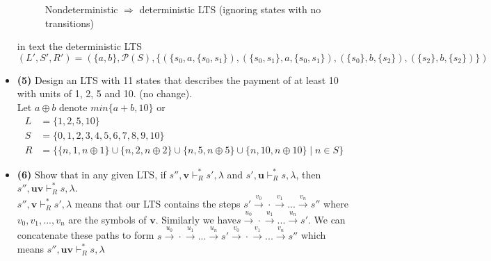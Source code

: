 \documentclass[defaultpackages]{simplereport}
\newcommand{\powerset}[1]{\mathcal{P}(#1)}
\begin{document}
\begin{itemize}[label=]
\begin{figure}[H]
\caption*{Nondeterministic $\Rightarrow$ deterministic LTS (ignoring states with
  no transitions)}
\end{figure}
in text the deterministic LTS $$(L', S', R') = (\{a, b\}, \powerset{S}, \{(\{s_0,
a, \{s_0, s_1\}), (\{s_0, s_1\}, a, \{s_0, s_1\}), (\{s_0\}, b, \{s_2\}),
(\{s_2\}, b, \{s_2\})\})$$

\item \textbf{(5)} Design an LTS with 11 states that describes the payment of at
  least 10 with units of 1, 2, 5 and 10. (no change).
  \\
  Let $a \oplus b \text{ denote } min\{a+b, 10\}$ or 
  \begin{equation*}
    \begin{split}
      L & = \{1, 2, 5, 10\}\\
      S & = \{0, 1, 2, 3, 4, 5, 6, 7, 8, 9, 10\}\\
      R & = \{\{n, 1, n \oplus 1\} \cup\{n, 2, n \oplus 2\} \cup \{n, 5, n \oplus 5\} \cup \{n, 10, n \oplus 10\} \mid n \in S\}
    \end{split}
  \end{equation*}

  \item \textbf{(6)} Show that in any given LTS, if $s'',\bm{v} \vdash^*_R s',
    \lambda$ and $s', \bm{u} \vdash^*_R s, \lambda$, then $s'', \bm{uv}
    \vdash^*_R s, \lambda$.
    \\
 $s'',\bm{v} \vdash^*_R s',\lambda$ means that our LTS contains the steps $s'
 \xrightarrow{v_0} \cdot \xrightarrow{v_1}...\xrightarrow{v_n}s''$ where $v_0,
 v_1,...,v_n$ are the symbols of $\bm{v}$. Similarly we have$s
 \xrightarrow{u_0} \cdot \xrightarrow{u_1}...\xrightarrow{u_n}s'$. We can
 concatenate these paths to form $s
 \xrightarrow{u_0} \cdot \xrightarrow{u_1}...\xrightarrow{u_n}s'
 \xrightarrow{v_0} \cdot \xrightarrow{v_1}...\xrightarrow{v_n}s''$ which means $s'', \bm{uv}
    \vdash^*_R s, \lambda$


\end{itemize}
\end{document}
